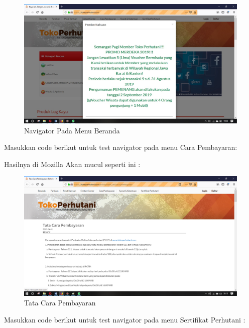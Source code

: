 \begin{figure}[ht!]
	\centering
	\includegraphics[scale=0.3]{figures/1x}
	\caption{Navigator Pada Menu Beranda}
\end{figure}

Masukkan code berikut untuk test navigator pada menu Cara Pembayaran:



Hasilnya  di Mozilla Akan mucul seperti ini :
\begin{figure}[h]
	\centering
	\includegraphics[scale=0.3]{figures/2}
	\caption{Tata Cara Pembayaran}
\end{figure}

Masukkan code berikut untuk test navigator pada menu Sertifikat Perhutani :



